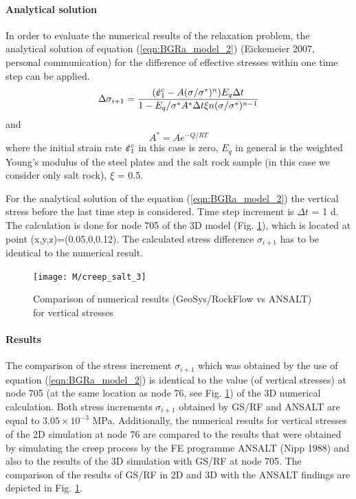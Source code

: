 \paragraph*{Analytical solution}
%
In order to evaluate the numerical results of the relaxation
problem, the analytical solution of equation
(\ref{eqn:BGRa_model_2}) (Eickemeier 2007, personal communication)
for the difference of effective stresses within one time step can be
applied.
%
\begin{equation}
\Delta\sigma_{i+1}
=
\frac
{(\dot{\boldsymbol{\varepsilon}}^{c}_1 - A (\sigma/\sigma^*)^n) E_q \Delta t}
{1 - E_q / \sigma^* A^* \Delta t \xi n (\sigma/\sigma^*)^{n-1}}
\label{eqn:BGRa_model_2}
\end{equation}
%
and
%
\begin{equation}
A^*
=
A e^{-Q/RT}
\label{eqn:BGRa_model_3}
\end{equation}
%
where the initial strain rate $\dot{\boldsymbol{\varepsilon}}^{c}_1$ in this case is
zero, $E_q$ in general is the weighted Young's modulus of the steel
plates and the salt rock sample (in this case we consider only salt
rock), $\xi$ = 0.5.

For the analytical solution of the equation (\ref{eqn:BGRa_model_2})
the vertical stress before the last time step is considered. Time
step increment is $\Delta t$ = 1 d. The calculation is done for node
705 of the 3D model (Fig. \ref{fig:creep_salt_3}), which is located
at point (x,y,z)=(0.05,0,0.12). The calculated stress difference
$\sigma_{i+1}$ has to be identical to the numerical result.

\begin{figure}[H]
\centering
\texttt{[image: M/creep\_salt\_3]}
\caption{Comparison of numerical results (GeoSys/RockFlow vs ANSALT) for vertical stresses}
\label{fig:creep_salt_3}
\end{figure}

\paragraph*{Results}
%
The comparison of the stress increment $\sigma_{i+1}$ which was
obtained by the use of equation (\ref{eqn:BGRa_model_2}) is
identical to the value (of vertical stresses) at node 705 (at the
same location as node 76, see Fig. \ref{fig:creep_salt_3}) of the 3D
numerical calculation. Both stress increments $\sigma_{i+1}$
obtained by GS/RF and ANSALT are equal to $3.05\times 10^{-3}$ MPa.
Additionally, the numerical results for vertical stresses of the 2D
simulation at node 76 are compared to the results that were obtained
by simulating the creep process by the FE programme ANSALT (Nipp
1988) and also to the results of the 3D simulation with GS/RF at
node 705. The comparison of the results of GS/RF in 2D and 3D with
the ANSALT findings are depicted in Fig. \ref{fig:creep_salt_3}.

